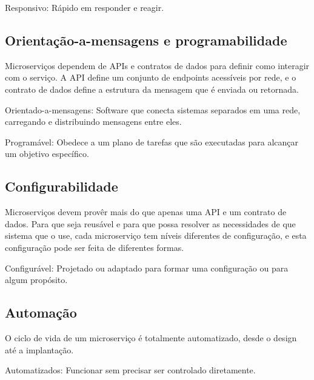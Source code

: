 Responsivo: Rápido em responder e reagir.

\subsection{Orientação-a-mensagens e programabilidade}

Microserviços dependem de APIs e contratos de dados para definir como interagir com o serviço. A API define um conjunto de endpoints acessíveis por rede, e o contrato de dados define a estrutura da mensagem que é enviada ou retornada.

Orientado-a-mensagens: Software que conecta sistemas separados em uma rede, carregando e distribuindo mensagens entre eles.

Programável: Obedece a um plano de tarefas que são executadas para alcançar um objetivo específico.

\subsection{Configurabilidade}

Microserviços devem provêr mais do que apenas uma API e um contrato de dados. Para que seja reusável e para que possa resolver as necessidades de que sistema que o use, cada microserviço tem níveis diferentes de configuração, e esta configuração pode ser feita de diferentes formas.

Configurável: Projetado ou adaptado para formar uma configuração ou para algum propósito.

\subsection {Automação}

O ciclo de vida de um microserviço é totalmente automatizado, desde o design até a implantação.

Automatizados: Funcionar sem precisar ser controlado diretamente.



